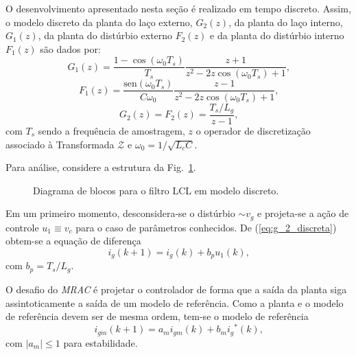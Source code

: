     O desenvolvimento apresentado nesta seção é realizado em tempo discreto. Assim,
    o modelo discreto da planta do laço externo, $G_2(z)$, da planta do laço interno,
    $G_1(z)$, da planta do distúrbio externo $F_2(z)$ e da planta do distúrbio interno
    $F_1(z)$ são dados por:
    \begin{equation}
        G_1(z) = \frac{1 - \cos(\omega_0 T_s)}{T_s} \frac{z + 1}{z^2 - 2z
            \cos(\omega_0 T_s) + 1} \text{,}
    \end{equation}
    \begin{equation}
        F_1(z) = \frac{\text{sen}(\omega_0 T_s)}{C \omega_0} \frac{z - 1}
            {z^2 - 2z \cos(\omega_0 T_s) + 1} \text{,}
    \end{equation}
    \begin{equation}
        G_2(z) = F_2(z) = \frac{T_s / L_g}{z - 1} \text{,}
        \label{eq:g_2_discreta}
    \end{equation}
    com $T_s$ sendo a frequência de amostragem, $z$ o operador de discretização
    associado à Transformada $\mathcal{Z}$ e $\omega_0 = 1 / \sqrt{L_c C}$.

    Para análise, considere a estrutura da Fig.~\ref{fig:LCL_discreto}.
    \begin{figure}[htb]
        \centering{
            \def\svgwidth{0.9\textwidth}
            }
        \renewcommand\figurename{Fig.}
        \caption{Diagrama de blocos para o filtro LCL em modelo discreto.}
        \label{fig:LCL_discreto}
    \end{figure}

    Em um primeiro momento, desconsidera-se o distúrbio $\sim$$v_g$ e projeta-se
    a ação de controle $u_1 \equiv v_c$ para o caso de parâmetros conhecidos. De
    (\ref{eq:g_2_discreta}) obtem-se a equação de diferença
    \begin{equation}
        i_g (k + 1) = i_g (k) + b_p u_1 (k) \text{,}
        \label{eq:diferenca}
    \end{equation}
    com $b_p = T_s / L_g$.

    O desafio do \emph{MRAC} é projetar o controlador de forma que a saída da
    planta siga assintoticamente a saída de um modelo de referência. Como a planta
    e o modelo de referência devem ser de mesma ordem, tem-se o modelo
    de referência
    \begin{equation}
        i_{gm} (k + 1) = a_m i_{gm} (k) + b_m {i_g}^* (k) \text{,}
        \label{eq:modelo_referencia}
    \end{equation}
    com $| a_m | \le 1$ para estabilidade.

